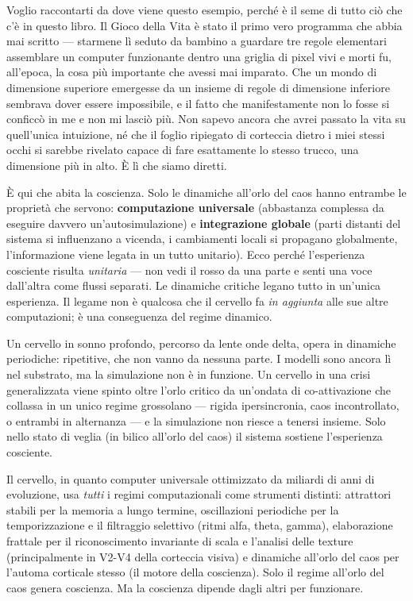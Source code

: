 \documentclass[11pt, twoside, openright]{book}
\begin{document}
Voglio raccontarti da dove viene questo esempio, perché è il seme di tutto ciò che c'è in questo libro. Il Gioco della Vita è stato il primo vero programma che abbia mai scritto --- starmene lì seduto da bambino a guardare tre regole elementari assemblare un computer funzionante dentro una griglia di pixel vivi e morti fu, all'epoca, la cosa più importante che avessi mai imparato. Che un mondo di dimensione superiore emergesse da un insieme di regole di dimensione inferiore sembrava dover essere impossibile, e il fatto che manifestamente non lo fosse si conficcò in me e non mi lasciò più. Non sapevo ancora che avrei passato la vita su quell'unica intuizione, né che il foglio ripiegato di corteccia dietro i miei stessi occhi si sarebbe rivelato capace di fare esattamente lo stesso trucco, una dimensione più in alto. È lì che siamo diretti.

È qui che abita la coscienza. Solo le dinamiche all'orlo del caos hanno entrambe le proprietà che servono: \textbf{computazione universale} (abbastanza complessa da eseguire davvero un'autosimulazione) e \textbf{integrazione globale} (parti distanti del sistema si influenzano a vicenda, i cambiamenti locali si propagano globalmente, l'informazione viene legata in un tutto unitario). Ecco perché l'esperienza cosciente risulta \textit{unitaria} --- non vedi il rosso da una parte e senti una voce dall'altra come flussi separati. Le dinamiche critiche legano tutto in un'unica esperienza. Il legame non è qualcosa che il cervello fa \textit{in aggiunta} alle sue altre computazioni; è una conseguenza del regime dinamico.

Un cervello in sonno profondo, percorso da lente onde delta, opera in dinamiche periodiche: ripetitive, che non vanno da nessuna parte. I modelli sono ancora lì nel substrato, ma la simulazione non è in funzione. Un cervello in una crisi generalizzata viene spinto oltre l'orlo critico da un'ondata di co-attivazione che collassa in un unico regime grossolano --- rigida ipersincronia, caos incontrollato, o entrambi in alternanza --- e la simulazione non riesce a tenersi insieme. Solo nello stato di veglia (in bilico all'orlo del caos) il sistema sostiene l'esperienza cosciente.

Il cervello, in quanto computer universale ottimizzato da miliardi di anni di evoluzione, usa \textit{tutti} i regimi computazionali come strumenti distinti: attrattori stabili per la memoria a lungo termine, oscillazioni periodiche per la temporizzazione e il filtraggio selettivo (ritmi alfa, theta, gamma), elaborazione frattale per il riconoscimento invariante di scala e l'analisi delle texture (principalmente in V2-V4 della corteccia visiva) e dinamiche all'orlo del caos per l'automa corticale stesso (il motore della coscienza). Solo il regime all'orlo del caos genera coscienza. Ma la coscienza dipende dagli altri per funzionare.
\end{document}
